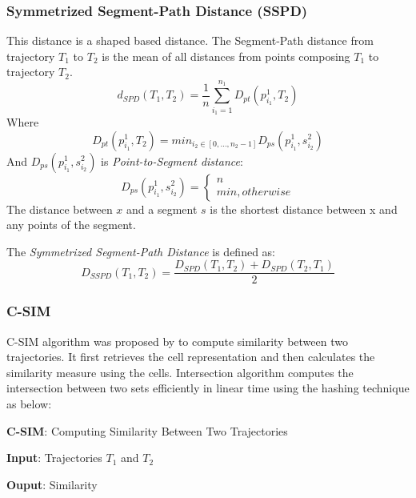 \documentclass[a4paper, 12pt]{article}
\begin{document}
\subsubsection{Symmetrized Segment-Path Distance (SSPD)}
This distance is a shaped based distance. The Segment-Path distance from trajectory $T_{1}$ to $T_{2}$ is the mean of all distances from points composing $T_{1}$ to trajectory $T_{2}$.
\begin{equation} \label{eq8}
    d_{SPD}(T_{1},T_{2}) = \frac{1}{n} \sum_{i_{1}=1}^{n_{1}}D_{pt}(p_{i_{1}}^1, T_{2})
\end{equation}
Where
\begin{equation} \label{eq9}
    D_{pt}(p_{i_{1}}^1, T_{2}) = min_{i_{2} \in [0,\dots,n_{2}-1]}D_{ps}(p_{i_{1}}^1, s_{i_{2}}^2)
\end{equation}
And $D_{ps}(p_{i_{1}}^1, s_{i_{2}}^2)$ is \textit{Point-to-Segment distance}:
\begin{equation} \label{eq10}
    D_{ps}(p_{i_{1}}^1, s_{i_{2}}^2) = \begin{cases}
                                            n \\
                                            min, otherwise 
                                        \end{cases}
\end{equation}
The distance between $x$ and a segment $s$ is the shortest distance between x and any points of the segment.

The \textit{Symmetrized Segment-Path Distance} is defined as:
\begin{equation} \label{eq11}
    D_{SSPD}(T_{1}, T_{2}) = \frac{D_{SPD}(T_{1}, T_{2}) + D_{SPD}(T_{2}, T_{1})}{2}
\end{equation}

\subsubsection{C-SIM}
C-SIM algorithm was proposed by \cite{mariescu2017grid} to compute similarity between two trajectories. It first retrieves the cell representation and then calculates the similarity measure using the cells. Intersection algorithm computes the intersection between two sets efficiently in linear time using the hashing technique as below:

\textbf{C-SIM}: Computing Similarity Between Two Trajectories

\textbf{Input}: Trajectories $T_{1}$ and $T_{2}$

\textbf{Ouput}: Similarity
\end{document}
